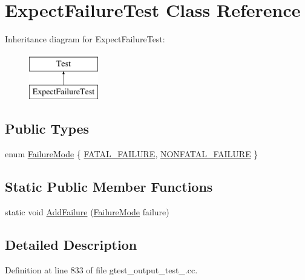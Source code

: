 \hypertarget{classExpectFailureTest}{\section{\-Expect\-Failure\-Test \-Class \-Reference}
\label{d2/dc2/classExpectFailureTest}
}
\-Inheritance diagram for \-Expect\-Failure\-Test\-:\begin{figure}[H]
\begin{center}
\leavevmode
\includegraphics[height=2.000000cm]{d2/dc2/classExpectFailureTest}
\end{center}
\end{figure}
\subsection*{\-Public \-Types}
\begin{DoxyCompactItemize}
\item 
enum \hyperlink{classExpectFailureTest_a36af391de8ae7d354429eaeedd5c4f0c}{\-Failure\-Mode} \{ \hyperlink{classExpectFailureTest_a36af391de8ae7d354429eaeedd5c4f0caaf37307d9567d9e9b9e405706003c7be}{\-F\-A\-T\-A\-L\-\_\-\-F\-A\-I\-L\-U\-R\-E}, 
\hyperlink{classExpectFailureTest_a36af391de8ae7d354429eaeedd5c4f0ca395c614e5ee86525b22206e599225144}{\-N\-O\-N\-F\-A\-T\-A\-L\-\_\-\-F\-A\-I\-L\-U\-R\-E}
 \}
\end{DoxyCompactItemize}
\subsection*{\-Static \-Public \-Member \-Functions}
\begin{DoxyCompactItemize}
\item 
static void \hyperlink{classExpectFailureTest_a706941a5936628efce1baed71870c17b}{\-Add\-Failure} (\hyperlink{classExpectFailureTest_a36af391de8ae7d354429eaeedd5c4f0c}{\-Failure\-Mode} failure)
\end{DoxyCompactItemize}


\subsection{\-Detailed \-Description}


\-Definition at line 833 of file gtest\-\_\-output\-\_\-test\-\_\-.\-cc.




